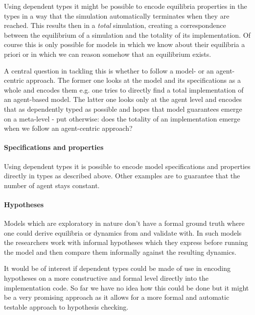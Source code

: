 Using dependent types it might be possible to encode equilibria properties in the types in a way that the simulation automatically terminates when they are reached. This results then in a \textit{total} simulation, creating a correspondence between the equilibrium of a simulation and the totality of its implementation. Of course this is only possible for models in which we know about their equilibria a priori or in which we can reason somehow that an equilibrium exists.

A central question in tackling this is whether to follow a model- or an agent-centric approach. The former one looks at the model and its specifications as a whole and encodes them e.g. one tries to directly find a total implementation of an agent-based model. The latter one looks only at the agent level and encodes that as dependently typed as possible and hopes that model guarantees emerge on a meta-level - put otherwise: does the totality of an implementation emerge when we follow an agent-centric approach?

\paragraph{Specifications and properties}
Using dependent types it is possible to encode model specifications and properties directly in types as described above. Other examples are to guarantee that the number of agent stays constant.

\paragraph{Hypotheses}
Models which are exploratory in nature don't have a formal ground truth where one could derive equilibria or dynamics from and validate with. In such models the researchers work with informal hypotheses which they express before running the model and then compare them informally against the resulting dynamics.

It would be of interest if dependent types could be made of use in encoding hypotheses on a more constructive and formal level directly into the implementation code. So far we have no idea how this could be done but it might be a very promising approach as it allows for a more formal and automatic testable approach to hypothesis checking.

